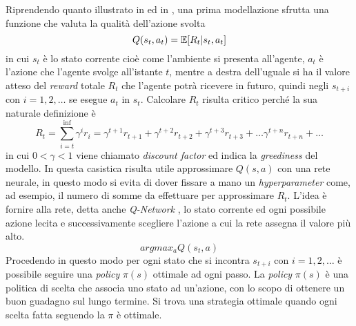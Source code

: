 Riprendendo quanto illustrato in \cite{MIT_RL} ed in \cite{Simple_RL}, una prima modellazione sfrutta una funzione che valuta la qualità dell'azione svolta 
$$
Q(s_t, a_t) = \mathbb{E} [ R_t | s_t, a_t]
$$
in cui 
$s_t$ è lo stato corrente cioè come l'ambiente si presenta all'agente,
$a_t$ è l'azione che l'agente svolge all'istante $t$,
mentre a destra dell'uguale si ha il valore atteso del \emph{reward} totale $R_t$ che l'agente potrà ricevere in futuro, quindi negli $s_{t+i}$ con $i=1,2,\dots$ se esegue $a_t$ in $s_t$.
Calcolare $R_t$ risulta critico perché la sua naturale definizione è
$$
R_t = \sum_{i=t}^{\inf} \gamma^i r_i = 
\gamma^{t+1} r_{t+1} + 
\gamma^{t+2} r_{t+2} + 
\gamma^{t+3} r_{t+3} + \dots
\gamma^{t+n} r_{t+n} + \dots
$$
in cui $0 < \gamma < 1$  viene chiamato \emph{discount factor} ed indica la \emph{greediness} del modello. %
In questa casistica risulta utile approssimare $Q(s,a)$ con una rete neurale, in questo modo si evita di dover fissare a mano un \emph{hyperparameter} come, ad esempio,  il numero di somme da effettuare per approssimare $R_t$.
L'idea è fornire alla rete, detta anche \emph{Q-Network} \cite{DQN}, lo stato corrente ed ogni possibile azione lecita e successivamente scegliere l'azione a cui la rete assegna il valore più alto.
$$
argmax_a Q(s_t, a) %
$$
Procedendo in questo modo per ogni stato che si incontra $s_{t+i}$ con $i=1,2,\dots$ è possibile seguire una \emph{policy} $\pi(s)$ ottimale ad ogni passo.
La \emph{policy} $\pi(s)$ è una politica di scelta che associa uno stato ad un'azione, con lo scopo di ottenere un buon guadagno sul lungo termine.
Si trova una strategia ottimale quando ogni scelta fatta seguendo la $\pi$ è ottimale.


